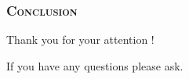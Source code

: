 \documentclass{beamer}
\begin{document}
    \begin{frame}
        \frametitle{\textsc{Conclusion}}
        \begin{LARGE}
        \centering    
        Thank you for your attention !
        \vspace{0.5cm}
        
        \centering
        If you have any questions please ask.
        
        \end{LARGE}

       \end{frame}
       
    
\end{document}
